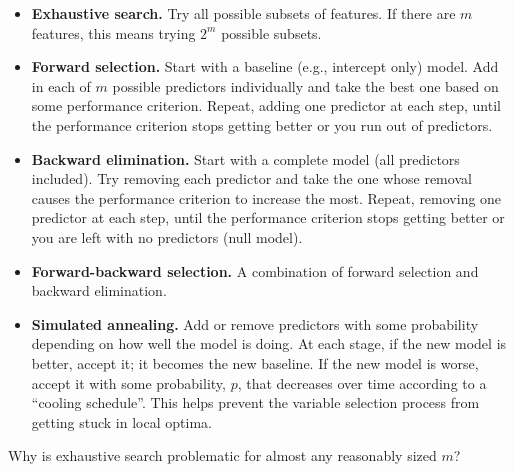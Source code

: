 \begin{itemize}
\item \textbf{Exhaustive search.} Try all possible subsets of features. If there are $m$ features, this means trying $2^m$ possible subsets.
\item \textbf{Forward selection.} Start with a baseline (e.g., intercept only) model. Add in each of $m$ possible predictors individually and take the best one based on some performance criterion. Repeat, adding one predictor at each step, until the performance criterion stops getting better or you run out of predictors. 
\item \textbf{Backward elimination.} Start with a complete model (all predictors included). Try removing each predictor and take the one whose removal causes the performance criterion to increase the most. Repeat, removing one predictor at each step, until the performance criterion stops getting better or you are left with no predictors (null model). 
\item \textbf{Forward-backward selection.} A combination of forward selection and backward elimination. 
\item \textbf{Simulated annealing.} Add or remove predictors with some probability depending on how well the model is doing. At each stage, if the new model is better, accept it; it becomes the new baseline. If the new model is worse, accept it with some probability, $p$, that decreases over time according to a ``cooling schedule''. This helps prevent the variable selection process from getting stuck in local optima. 
\end{itemize}

\begin{question}{}
Why is exhaustive search problematic for almost any reasonably sized $m$?
\end{question}

\vspace{2mm}

